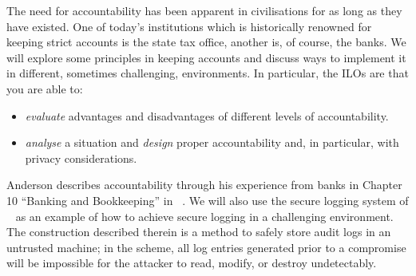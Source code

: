 The need for accountability has been apparent in civilisations for as long as 
they have existed.
One of today's institutions which is historically renowned for keeping strict 
accounts is the state tax office, another is, of course, the banks.
We will explore some principles in keeping accounts and discuss ways to 
implement it in different, sometimes challenging, environments.
In particular, the \acp{ILO} are that you are able to:
\begin{itemize}
  \item \emph{evaluate} advantages and disadvantages of different levels of 
    accountability.
  \item \emph{analyse} a situation and \emph{design} proper accountability and,
    in particular, with privacy considerations.
\end{itemize}

Anderson describes accountability through his experience from banks in Chapter 
10 \enquote{Banking and Bookkeeping} in 
~\cite{Anderson2008sea}.
We will also use the secure logging system of 
\citeauthor{schneier1999secure}~\cite{schneier1999secure} as an example of how 
to achieve secure logging in a challenging environment.
The construction described therein is a method to safely store audit logs in an 
untrusted machine; in the scheme, all log entries generated prior to 
a compromise will be impossible for the attacker to read, modify, or destroy 
undetectably.
